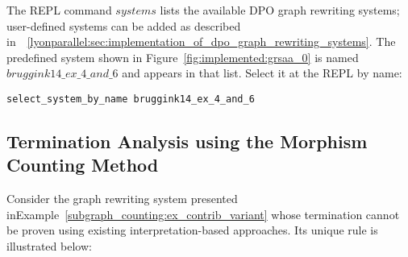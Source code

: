The REPL command \colorbox{Ivory2}{$systems$} lists the available DPO graph rewriting systems; user-defined systems can be added as described in~\textsection~\ref{lyonparallel:sec:implementation_of_dpo_graph_rewriting_systems}. The predefined system shown in Figure~\ref{fig:implemented:grsaa_0} is named \colorbox{Ivory2}{$bruggink14\_ex\_4\_and\_6$} and appears in that list. Select it at the REPL by name:
\begin{verbatim}
select_system_by_name bruggink14_ex_4_and_6
\end{verbatim}


\subsection{Termination Analysis using the Morphism Counting Method}
Consider the graph rewriting system presented inExample~\ref{subgraph_counting:ex_contrib_variant} whose termination cannot be proven using existing interpretation-based approaches. Its unique rule is illustrated below:

